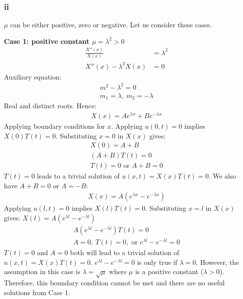\documentclass[11pt]{article}
\numberwithin{equation}{section}
\begin{document}
\subsubsection*{ii}
$\mu$ can be either positive, zero or negative. Let us consider these cases. 

\textbf{Case 1: positive constant $\mu = \lambda^2 > 0$}
\begin{align}
	\frac{X''\left(x\right)}{X\left(x\right)} &= \lambda^2\\
	X''\left(x\right) - \lambda^2X\left(x\right) &= 0 
\end{align}
Auxiliary equation:
\begin{gather}
	m^2 - \lambda^2 = 0\\
	m_1 = \lambda, \ m_2 = -\lambda
\end{gather}
Real and distinct roots. Hence:
\begin{align}
	X(x) = Ae^{\lambda x} + Be^{-\lambda x}
\end{align}
Applying boundary conditions for $x$. Applying $u\left(0,t\right) = 0$ implies $X(0)T(t) = 0$. Substituting $x=0$ in $X(x)$ gives:
\begin{gather}
	X(0) = A + B\\
	\left(A+B\right)T(t) = 0\\
	T(t) = 0 \textrm{ or } A + B =0
\end{gather}
$T(t) = 0$ leads to a trivial solution of $u(x,t) = X(x)T(t) = 0$. We also have $A + B = 0$ or $A = - B$:
\begin{gather}
	X(x) = A\left(e^{\lambda x} - e^{-\lambda x}\right)
\end{gather}
Applying $u(l,t) = 0$ implies $X(l)T(t) = 0$. Substituting $x=l$ in $X(x)$ gives: $X(l) = A\left(e^{\lambda l} - e^{-\lambda l}\right)$
\begin{gather}
	A\left(e^{\lambda l} - e^{-\lambda l}\right)T(t) = 0\\
	A = 0, \ T(t) = 0, \textrm{ or } e^{\lambda l} - e^{-\lambda l} = 0
\end{gather}
$T(t) = 0$ and $A=0$ both will lead to a trivial solution of $u(x,t) = X(x)T(t) =0$. $e^{\lambda l} - e^{-\lambda l} = 0$ is only true if $\lambda = 0$. However, the assumption in this case is $\lambda = \sqrt{\mu}$ where $\mu$ is a positive constant ($\lambda > 0$). Therefore, this boundary condition cannot be met and there are no useful solutions from Case 1.
\end{document}
